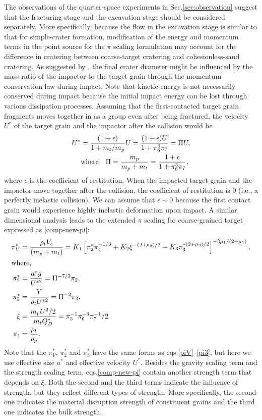 \documentclass[3p,authoryear]{elsarticle}
\begin{document}
The observations of the quarter-space experiments in Sec.\ref{sec:observation} suggest that the fracturing stage and the excavation stage should be considered separately.
More specifically, because the flow in the excavation stage is similar to that for simple-crater formation, modification of the energy and momentum terms in the point source for the $\pi$ scaling formulation may account for the difference in cratering between coarse-target cratering and cohesionless-sand cratering.
As suggested by \citet{guettler2012}, the final crater diameter might be influenced by the mass ratio of the impactor to the target grain through the momentum conservation law during impact.
Note that kinetic energy is not necessarily conserved during impact because the initial impact energy can be lost through various dissipation processes.
Assuming that the first-contacted target grain fragments moves together in as a group even after being fractured, the velocity $U^*$ of the target grain and the impactor after the collision would be
\begin{align}
	U^*&=\frac{(1+\epsilon)}{1+m_t/m_p}U=\frac{(1+\epsilon)U}{1+\pi_6^3\pi_7}=\Pi U,\\
	&{\rm where}\quad \Pi=\frac{m_p}{m_p+m_t}=\frac{1+\epsilon}{1+\pi_6^3\pi_7},\notag
\end{align}
where $\epsilon$ is the coefficient of restitution.
When the impacted target grain and the impactor move together after the collision, the coefficient of restitution is 0 (i.e., a perfectly inelastic collision).
We can assume that $\epsilon \sim 0$ because the first contact grain would experience highly inelastic deformation upon impact.
A similar dimensional analysis leads to the extended $\pi$ scaling for coarse-grained target expressed as \eqref{comp-new-pi}:
\begin{align}
	\pi_V^*&=\frac{\rho_t V_c}{(m_p+m_t)}=K_1\left[\pi^*_2\pi_4^{-1/3}+K_2\xi^{-(2+\mu_2)/2}+K_3\pi_3^{*(2+\mu_3)/2} \right]^{-3\mu_1/(2+\mu_1)}, \label{comp-new-pi}\\
	\intertext{where,}
	\pi_2^*&=\frac{a^*g}{U^{*2}}=\Pi^{-7/3}\pi_2, \notag\\
	 \pi_3^*&=\frac{\bar{Y}}{\rho_tU^{*2}}=\Pi^{-2}\pi_3, \notag\\
	 \xi&=\frac{m_pU^2/2}{m_tQ_D^*}=\pi_5^{-1}\pi_6^{-3}\pi_7^{-1}/2 \notag\\
	 \pi_4&=\frac{\rho_t}{\rho_p}.\notag
\end{align}
Note that the $\pi_V^*,\,\pi_2^*$ and $\pi_3^*$ have the same forms as eqs.\eqref{piV}--\eqref{pi3}, but here we use effective size $a^*$ and effective velocity $U^*$. Besides the gravity scaling term and the strength scaling term, eqs.\eqref{comp-new-pi} contain another strength term that depends on $\xi$. Both the second and the third terms indicate the influence of strength, but they reflect different types of strength. More specifically, the second one indicates the material disruption strength of constituent grains and the third one indicates the bulk strength.
\end{document}
